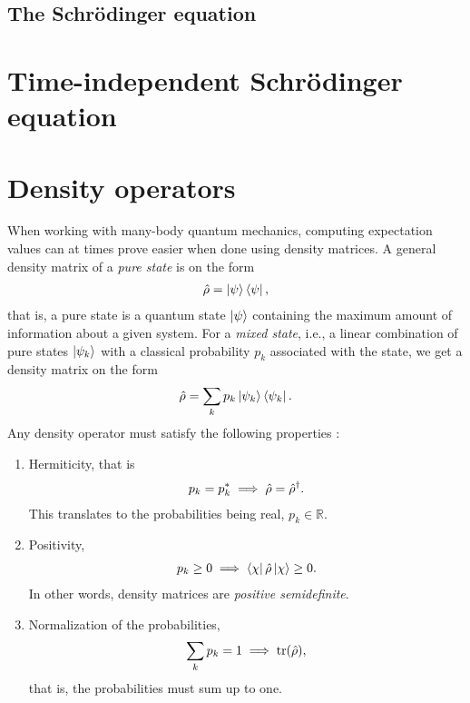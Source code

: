         \subsection{The Schrödinger equation}

    \section{Time-independent Schrödinger equation}

    \section{Density operators}
        \label{sec:density-operators}
        When working with many-body quantum mechanics, computing expectation
        values can at times prove easier when done using density matrices. A
        general density matrix of a \emph{pure state} is on the form
        \begin{align}
            \hat{\rho} = \ket{\psi}\bra{\psi},
        \end{align}
        that is, a pure state is a quantum state $\ket{\psi}$ containing the
        maximum amount of information about a given system. For a \emph{mixed
        state}, i.e., a linear combination of pure states $\ket{\psi_k}$ with a
        classical probability $p_k$ associated with the state, we get a density
        matrix on the form
        \begin{align}
            \hat{\rho} = \sum_{k} p_k \ket{\psi_k}\bra{\psi_k}.
        \end{align}
        Any density operator must satisfy the following
        properties \cite{modern-qm}:
        \begin{enumerate}
            \item Hermiticity, that is
                \begin{align}
                    p_k = p_k^{*} \implies \hat{\rho} = \hat{\rho}^{\dagger}.
                \end{align}
                This translates to the probabilities being real, $p_k \in
                \mathbb{R}$.
            \item Positivity,
                \begin{align}
                    p_k \geq 0 \implies \bra{\chi}\hat{\rho}\ket{\chi} \geq 0.
                \end{align}
                In other words, density matrices are \emph{positive
                semidefinite}.
            \item Normalization of the probabilities,
                \begin{align}
                    \sum_{k} p_k = 1 \implies \tr(\hat{\rho}),
                \end{align}
                that is, the probabilities must sum up to one.
        \end{enumerate}

